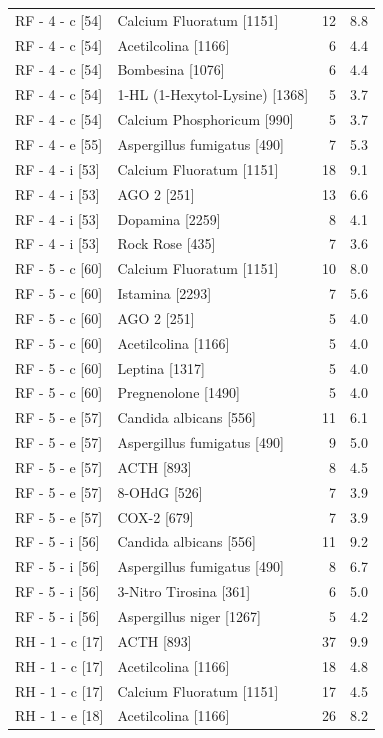 \documentclass[a4paper,11pt]{article}
\begin{document}
\begin{footnotesize}
\begin{longtable}{p{3.5cm}p{7.5cm}rr}
RF - 4 - c [54] & Calcium Fluoratum [1151] & 12 & 8.8 \\
RF - 4 - c [54] & Acetilcolina [1166] & 6 & 4.4 \\
RF - 4 - c [54] & Bombesina [1076] & 6 & 4.4 \\
RF - 4 - c [54] & 1-HL (1-Hexytol-Lysine) [1368] & 5 & 3.7 \\
RF - 4 - c [54] & Calcium Phosphoricum [990] & 5 & 3.7 \\
RF - 4 - e [55] & Aspergillus fumigatus [490] & 7 & 5.3 \\
RF - 4 - i [53] & Calcium Fluoratum [1151] & 18 & 9.1 \\
RF - 4 - i [53] & AGO 2 [251] & 13 & 6.6 \\
RF - 4 - i [53] & Dopamina [2259] & 8 & 4.1 \\
RF - 4 - i [53] & Rock Rose [435] & 7 & 3.6 \\
RF - 5 - c [60] & Calcium Fluoratum [1151] & 10 & 8.0 \\
RF - 5 - c [60] & Istamina [2293] & 7 & 5.6 \\
RF - 5 - c [60] & AGO 2 [251] & 5 & 4.0 \\
RF - 5 - c [60] & Acetilcolina [1166] & 5 & 4.0 \\
RF - 5 - c [60] & Leptina [1317] & 5 & 4.0 \\
RF - 5 - c [60] & Pregnenolone [1490] & 5 & 4.0 \\
RF - 5 - e [57] & Candida albicans [556] & 11 & 6.1 \\
RF - 5 - e [57] & Aspergillus fumigatus [490] & 9 & 5.0 \\
RF - 5 - e [57] & ACTH [893] & 8 & 4.5 \\
RF - 5 - e [57] & 8-OHdG [526] & 7 & 3.9 \\
RF - 5 - e [57] & COX-2 [679] & 7 & 3.9 \\
RF - 5 - i [56] & Candida albicans [556] & 11 & 9.2 \\
RF - 5 - i [56] & Aspergillus fumigatus [490] & 8 & 6.7 \\
RF - 5 - i [56] & 3-Nitro Tirosina [361] & 6 & 5.0 \\
RF - 5 - i [56] & Aspergillus niger [1267] & 5 & 4.2 \\
RH - 1 - c [17] & ACTH [893] & 37 & 9.9 \\
RH - 1 - c [17] & Acetilcolina [1166] & 18 & 4.8 \\
RH - 1 - c [17] & Calcium Fluoratum [1151] & 17 & 4.5 \\
RH - 1 - e [18] & Acetilcolina [1166] & 26 & 8.2 \\

\end{longtable}
\end{footnotesize}
\end{document}
